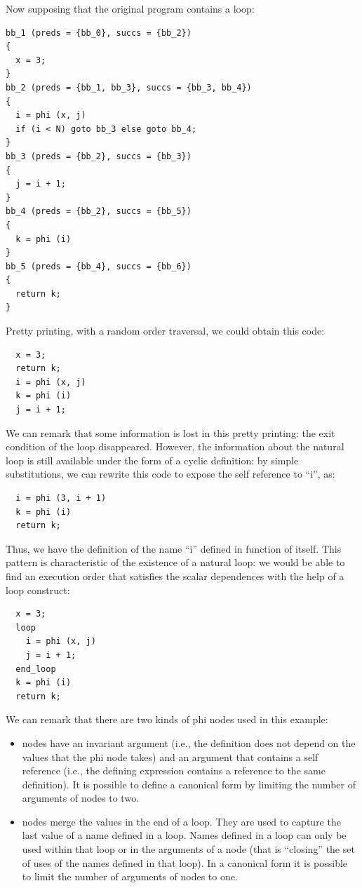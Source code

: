 Now supposing that the original program contains a loop:
\begin{verbatim}
bb_1 (preds = {bb_0}, succs = {bb_2})
{
  x = 3;
}
bb_2 (preds = {bb_1, bb_3}, succs = {bb_3, bb_4})
{
  i = phi (x, j)
  if (i < N) goto bb_3 else goto bb_4;
}
bb_3 (preds = {bb_2}, succs = {bb_3})
{
  j = i + 1;
}
bb_4 (preds = {bb_2}, succs = {bb_5})
{
  k = phi (i)
}
bb_5 (preds = {bb_4}, succs = {bb_6})
{
  return k;
}
\end{verbatim}
Pretty printing, with a random order traversal, we could obtain this
\SSA{} code:
\begin{verbatim}
  x = 3;
  return k;
  i = phi (x, j)
  k = phi (i)
  j = i + 1;
\end{verbatim}
We can remark that some information is lost in this pretty printing:
the exit condition of the loop disappeared.  However, the information
about the natural loop is still available under the form of a cyclic
definition: by simple substitutions, we can rewrite this \SSA{} code
to expose the self reference to ``i'', as:
\begin{verbatim}
  i = phi (3, i + 1)
  k = phi (i)
  return k;
\end{verbatim}
Thus, we have the definition of the \SSA{} name ``i'' defined in
function of itself.  This pattern is characteristic of the existence
of a natural loop: we would be able to find an execution order that
satisfies the scalar dependences with the help of a loop construct:
\begin{verbatim}
  x = 3;
  loop
    i = phi (x, j)
    j = i + 1;
  end_loop
  k = phi (i)
  return k;
\end{verbatim}
We can remark that there are two kinds of phi nodes used in this
example:
\begin{itemize}
\item \loopphi{} nodes have an invariant argument (i.e., the
  definition does not depend on the values that the phi node takes)
  and an argument that contains a self reference (i.e., the defining
  expression contains a reference to the same \loopphi{} definition).
  It is possible to define a canonical \SSA{} form by limiting the
  number of arguments of \loopphi{} nodes to two.
\item \closephi{} nodes merge the values in the end of a loop.  They
  are used to capture the last value of a name defined in a loop.
  Names defined in a loop can only be used within that loop or in the
  arguments of a \closephi{} node (that is ``closing'' the set of uses of
  the names defined in that loop).  In a canonical \SSA{} form it is
  possible to limit the number of arguments of \closephi{} nodes to
  one.
\end{itemize}

